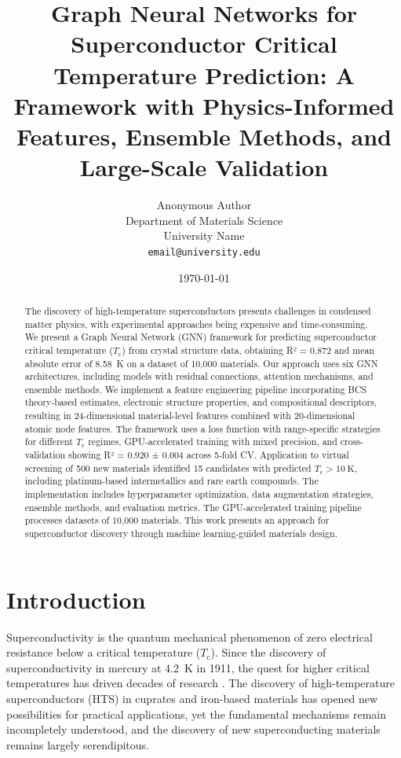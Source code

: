\documentclass[11pt,a4paper]{article}
\title{\Large \textbf{Graph Neural Networks for Superconductor Critical Temperature Prediction: A Framework with Physics-Informed Features, Ensemble Methods, and Large-Scale Validation}}
\author{
Anonymous Author\\
Department of Materials Science\\
University Name\\
\texttt{email@university.edu}
}
\date{\today}
\begin{document}
\maketitle

\begin{abstract}
The discovery of high-temperature superconductors presents challenges in condensed matter physics, with experimental approaches being expensive and time-consuming. We present a Graph Neural Network (GNN) framework for predicting superconductor critical temperature ($T_{\text{c}}$) from crystal structure data, obtaining R² = 0.872 and mean absolute error of \SI{8.58}{\kelvin} on a dataset of 10,000 materials. Our approach uses six GNN architectures, including models with residual connections, attention mechanisms, and ensemble methods. We implement a feature engineering pipeline incorporating BCS theory-based estimates, electronic structure properties, and compositional descriptors, resulting in 24-dimensional material-level features combined with 20-dimensional atomic node features. The framework uses a loss function with range-specific strategies for different $T_{\text{c}}$ regimes, GPU-accelerated training with mixed precision, and cross-validation showing R² = \num{0.920} ± \num{0.004} across 5-fold CV. Application to virtual screening of 500 new materials identified 15 candidates with predicted $T_{\text{c}} > \SI{10}{\kelvin}$, including platinum-based intermetallics and rare earth compounds. The implementation includes hyperparameter optimization, data augmentation strategies, ensemble methods, and evaluation metrics. The GPU-accelerated training pipeline processes datasets of 10,000 materials. This work presents an approach for superconductor discovery through machine learning-guided materials design.
\end{abstract}

\section{Introduction}

Superconductivity is the quantum mechanical phenomenon of zero electrical resistance below a critical temperature ($T_{\text{c}}$). Since the discovery of superconductivity in mercury at \SI{4.2}{\kelvin} in 1911, the quest for higher critical temperatures has driven decades of research \citep{bednorz1986possible}. The discovery of high-temperature superconductors (HTS) in cuprates and iron-based materials has opened new possibilities for practical applications, yet the fundamental mechanisms remain incompletely understood, and the discovery of new superconducting materials remains largely serendipitous.
\end{document}
